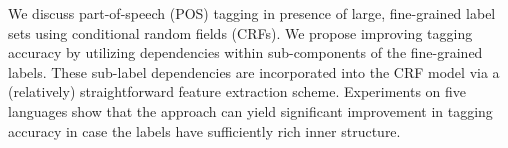 We discuss part-of-speech (POS) tagging in presence of large, fine-grained label sets using conditional random fields (CRFs). We propose improving tagging accuracy by utilizing dependencies within sub-components of the fine-grained labels. These sub-label dependencies are incorporated into the CRF model via a (relatively) straightforward feature extraction scheme. Experiments on five languages show that the approach can yield significant improvement in tagging accuracy in case the labels have sufficiently rich inner structure.
